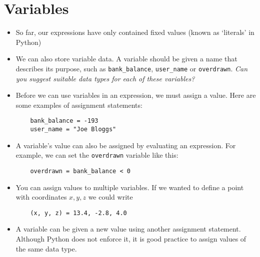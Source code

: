\documentclass[a4paper,twoside]{memoir}
\newcommand{\shellcmd}{\texttt}
\begin{document}
\section{Variables}
\begin{itemize}
	\item So far, our expressions have only contained fixed values (known as `literals' in Python)
	\item We can also store variable data.  A variable should be given a name that describes its purpose, such as \shellcmd{bank\_balance}, \shellcmd{user\_name} or \shellcmd{overdrawn}.  \textit{Can you suggest suitable data types for each of these variables?}
	\item Before we can use variables in an expression, we must assign a value.  Here are some examples of assignment statements:
\begin{verbatim}
	bank_balance = -193
	user_name = "Joe Bloggs"
\end{verbatim}
	\item A variable's value can also be assigned by evaluating an expression.  For example, we can set the \shellcmd{overdrawn} variable like this:
\begin{verbatim}
	overdrawn = bank_balance < 0
\end{verbatim}
	\item You can assign values to multiple variables.  If we wanted to define a point with coordinates $x, y, z$ we could write
\begin{verbatim}
	(x, y, z) = 13.4, -2.8, 4.0
\end{verbatim}
	\item A variable can be given a new value using another assignment statement.  Although Python does not enforce it, it is good practice to assign values of the same data type.
\end{itemize}
\end{document}
